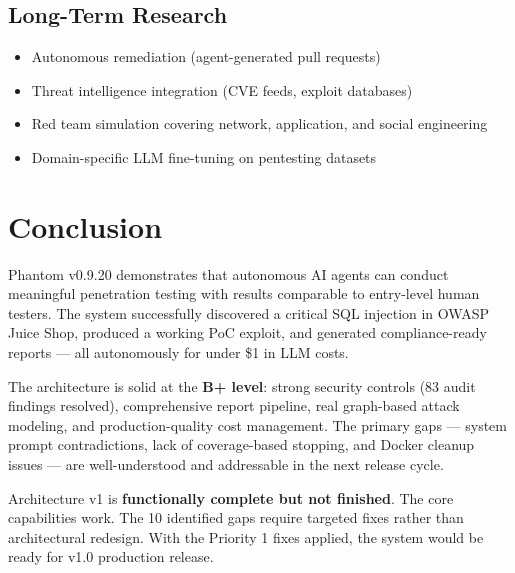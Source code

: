 \documentclass[12pt,a4paper]{report}
\begin{document}
\section{Long-Term Research}

\begin{itemize}
    \item Autonomous remediation (agent-generated pull requests)
    \item Threat intelligence integration (CVE feeds, exploit databases)
    \item Red team simulation covering network, application, and social engineering
    \item Domain-specific LLM fine-tuning on pentesting datasets
\end{itemize}


\chapter{Conclusion}

Phantom v0.9.20 demonstrates that autonomous AI agents can conduct meaningful penetration testing with results comparable to entry-level human testers. The system successfully discovered a critical SQL injection in OWASP Juice Shop, produced a working PoC exploit, and generated compliance-ready reports --- all autonomously for under \$1 in LLM costs.

The architecture is solid at the \textbf{B+ level}: strong security controls (83 audit findings resolved), comprehensive report pipeline, real graph-based attack modeling, and production-quality cost management. The primary gaps --- system prompt contradictions, lack of coverage-based stopping, and Docker cleanup issues --- are well-understood and addressable in the next release cycle.

Architecture v1 is \textbf{functionally complete but not finished}. The core capabilities work. The 10 identified gaps require targeted fixes rather than architectural redesign. With the Priority 1 fixes applied, the system would be ready for v1.0 production release.
\end{document}

